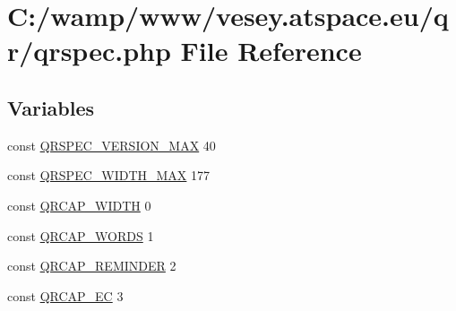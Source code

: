 \hypertarget{qrspec_8php}{\section{C\-:/wamp/www/vesey.atspace.\-eu/qr/qrspec.php File Reference}
\label{qrspec_8php}
}
\subsection*{Variables}
\begin{DoxyCompactItemize}
\item 
const \hyperlink{qrspec_8php_a3df227a9148948fa1ee539af90f8a26e}{Q\-R\-S\-P\-E\-C\-\_\-\-V\-E\-R\-S\-I\-O\-N\-\_\-\-M\-A\-X} 40
\item 
const \hyperlink{qrspec_8php_a587685a8aaa37d602445f9ba8500daa1}{Q\-R\-S\-P\-E\-C\-\_\-\-W\-I\-D\-T\-H\-\_\-\-M\-A\-X} 177
\item 
const \hyperlink{qrspec_8php_a78bf006d34f500b0ba1ae3ba9e31bf0f}{Q\-R\-C\-A\-P\-\_\-\-W\-I\-D\-T\-H} 0
\item 
const \hyperlink{qrspec_8php_af5ff4b071ceeb3bdd651ed067ffc4bc8}{Q\-R\-C\-A\-P\-\_\-\-W\-O\-R\-D\-S} 1
\item 
const \hyperlink{qrspec_8php_a53c4f9dd4e426f7e95f618a1ffd7b158}{Q\-R\-C\-A\-P\-\_\-\-R\-E\-M\-I\-N\-D\-E\-R} 2
\item 
const \hyperlink{qrspec_8php_a80654ddca1dd96ea4774fcf6230dbf2f}{Q\-R\-C\-A\-P\-\_\-\-E\-C} 3
\end{DoxyCompactItemize}


